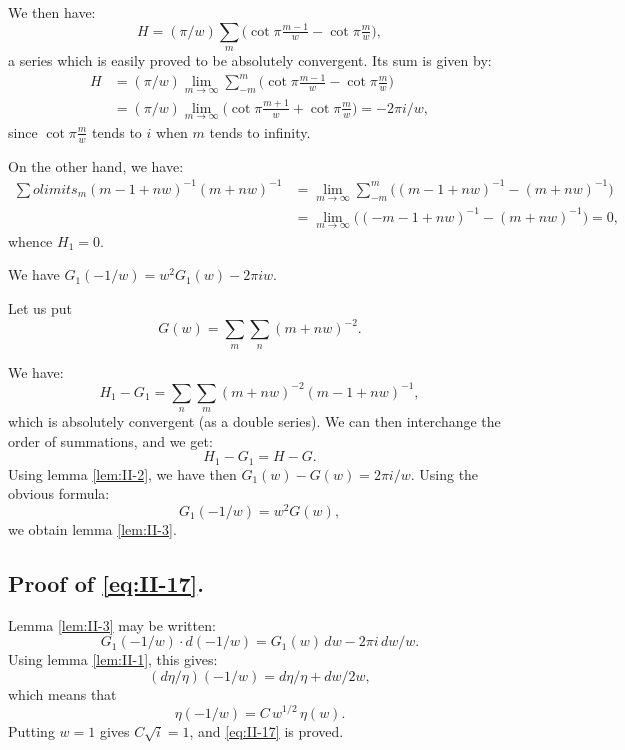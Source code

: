We then have:
\[
H=(\pi/w)\sum_{m}\bigl(\cot\pi\tfrac{m-1}{w}-\cot\pi\tfrac{m}{w}\bigr),
\]
a series which is easily proved to be absolutely convergent. Its sum is
given by:
\[
\begin{aligned}
H
&=(\pi/w)\lim_{m\to\infty}\sum_{-m}^{m}\bigl(\cot\pi\tfrac{m-1}{w}
 -\cot\pi\tfrac{m}{w}\bigr)\\
&=(\pi/w)\lim_{m\to\infty}\bigl(\cot\pi\tfrac{m+1}{w}+\cot\pi\tfrac{m}{w}\bigr)
=-2\pi i/w,
\end{aligned}
\]
since $\cot\pi\frac{m}{w}$ tends to $i$ when $m$ tends to infinity.

On the other hand, we have:
\[
\begin{aligned}
\sum
olimits_{m}(m-1+nw)^{-1}(m+nw)^{-1}
&=\lim_{m\to\infty}\sum_{-m}^{m}\bigl((m-1+nw)^{-1}-(m+nw)^{-1}\bigr)\\
&=\lim_{m\to\infty}\bigl((-m-1+nw)^{-1}-(m+nw)^{-1}\bigr)=0,
\end{aligned}
\]
whence $H_{1}=0$.

\begin{lemma}\label{lem:II-3}
We have $G_{1}(-1/w)=w^{2}G_{1}(w)-2\pi iw$.
\end{lemma}

Let us put
\[
G(w)=\sum_{m}\sum_{n}(m+nw)^{-2}.
\]

We have:
\[
H_{1}-G_{1}=\sum_{n}\sum_{m}(m+nw)^{-2}(m-1+nw)^{-1},
\]
which is absolutely convergent (as a double series). We can then
interchange the order of summations, and we get:
\[
H_{1}-G_{1}=H-G.
\]
Using lemma \ref{lem:II-2}, we have then $G_{1}(w)-G(w)=2\pi i/w$. Using
the obvious formula:
\[
G_{1}(-1/w)=w^{2}G(w),
\]
we obtain lemma \ref{lem:II-3}.

\subsection*{Proof of \texorpdfstring{\eqref{eq:II-17}}{(17)}.}

Lemma \ref{lem:II-3} may be written:
\[
G_{1}(-1/w)\cdot d(-1/w)=G_{1}(w)\,dw-2\pi i\,dw/w.
\]
Using lemma \ref{lem:II-1}, this gives:
\[
(d\eta/\eta)(-1/w)=d\eta/\eta+dw/2w,
\]
which means that
\[
\eta(-1/w)=C\,w^{1/2}\,\eta(w).
\]
Putting $w=1$ gives $C\sqrt{i}=1$, and \eqref{eq:II-17} is proved.
